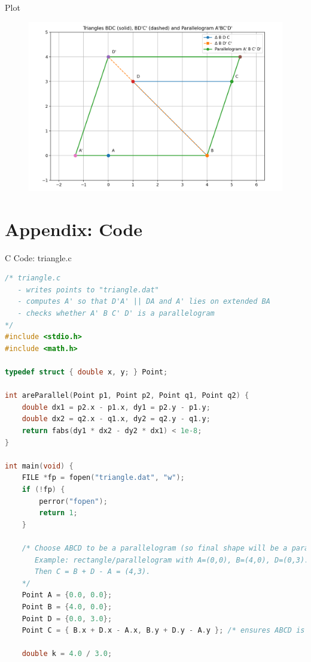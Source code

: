 \documentclass{beamer}
\numberwithin{equation}{section}
\theoremstyle{remark}
\begin{document}
\begin{frame}{Plot}
    \begin{figure}[H]
    \centering
    \includegraphics[width=1.0\columnwidth]{figs/01.png}
    \label{fig-1}
\end{figure}
\end{frame}

\section*{Appendix: Code}

\begin{frame}[fragile]{C Code: triangle.c}
\begin{lstlisting}[language=C]
/* triangle.c
   - writes points to "triangle.dat"
   - computes A' so that D'A' || DA and A' lies on extended BA
   - checks whether A' B C' D' is a parallelogram
*/
#include <stdio.h>
#include <math.h>

typedef struct { double x, y; } Point;

int areParallel(Point p1, Point p2, Point q1, Point q2) {
    double dx1 = p2.x - p1.x, dy1 = p2.y - p1.y;
    double dx2 = q2.x - q1.x, dy2 = q2.y - q1.y;
    return fabs(dy1 * dx2 - dy2 * dx1) < 1e-8;
}

int main(void) {
    FILE *fp = fopen("triangle.dat", "w");
    if (!fp) {
        perror("fopen");
        return 1;
    }

    /* Choose ABCD to be a parallelogram (so final shape will be a parallelogram).
       Example: rectangle/parallelogram with A=(0,0), B=(4,0), D=(0,3).
       Then C = B + D - A = (4,3).
    */
    Point A = {0.0, 0.0};
    Point B = {4.0, 0.0};
    Point D = {0.0, 3.0};
    Point C = { B.x + D.x - A.x, B.y + D.y - A.y }; /* ensures ABCD is parallelogram */

    double k = 4.0 / 3.0;
\end{lstlisting}
\end{frame}
\end{document}
